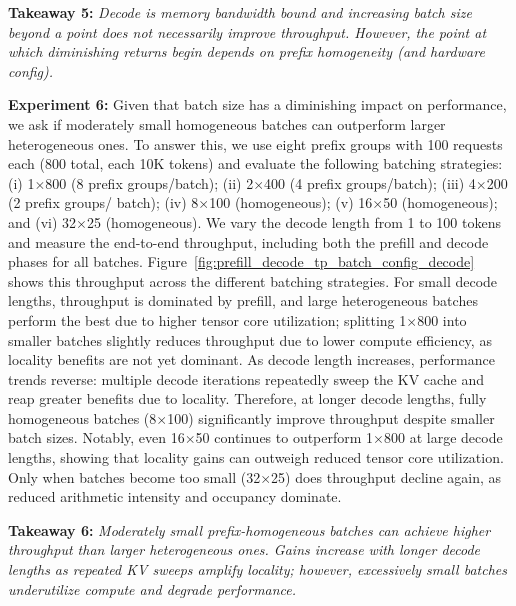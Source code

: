 \textbf{Takeaway 5:} \textit{Decode is memory bandwidth bound and increasing batch size beyond a point does not necessarily improve throughput. However, the point at which diminishing returns begin depends on prefix homogeneity (and hardware config).}

\textbf{Experiment 6:} Given that batch size has a diminishing impact on performance, we ask if moderately small homogeneous batches can outperform larger heterogeneous ones. To answer this, we use eight prefix groups with 100 requests each (800 total, each 10K tokens) and evaluate the following batching strategies: (i) 1$\times$800 (8 prefix groups/batch); (ii) 2$\times$400 (4 prefix groups/batch); (iii) 4$\times$200 (2 prefix groups/ batch); (iv) 8$\times$100 (homogeneous); (v) 16$\times$50 (homogeneous); and (vi) 32$\times$25 (homogeneous). We vary the decode length from 1 to 100 tokens and measure the end-to-end throughput, including both the prefill and decode phases for all batches. Figure~\ref{fig:prefill_decode_tp_batch_config_decode} shows this throughput across the different batching strategies. For small decode lengths, throughput is dominated by prefill, and large heterogeneous batches perform the best due to higher tensor core utilization; splitting 1$\times$800 into smaller batches slightly reduces throughput due to lower compute efficiency, as locality benefits are not yet dominant. As decode length increases, performance trends reverse: multiple decode iterations repeatedly sweep the KV cache and reap greater benefits due to locality. Therefore, at longer decode lengths, fully homogeneous batches (8$\times$100) significantly improve throughput despite smaller batch sizes. Notably, even 16$\times$50 continues to outperform 1$\times$800 at large decode lengths, showing that locality gains can outweigh reduced tensor core utilization. Only when batches become too small (32$\times$25) does throughput decline again, as reduced arithmetic intensity and occupancy dominate.
 
\textbf{Takeaway 6:} \textit{Moderately small prefix-homogeneous batches can achieve higher throughput than larger heterogeneous ones. Gains increase with longer decode lengths as repeated KV sweeps amplify locality; however, excessively small batches underutilize compute and degrade performance.}

